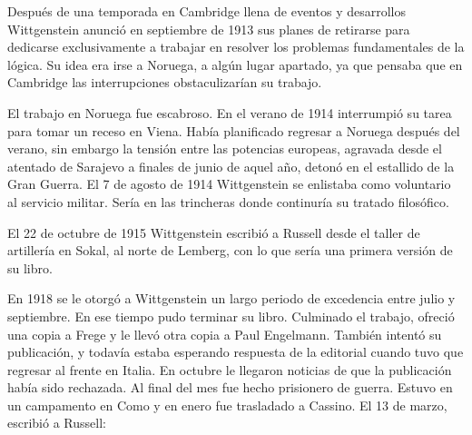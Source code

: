 Después de una temporada en Cambridge llena de eventos y desarrollos
Wittgenstein anunció en septiembre de 1913 sus planes de retirarse para
dedicarse exclusivamente a trabajar en resolver los problemas fundamentales de
la lógica. Su idea era irse a Noruega, a algún lugar apartado, ya que pensaba
que en Cambridge las interrupciones obstaculizarían su trabajo.\autocite[cap. 4
loc 1844]{monk1991duty}


El trabajo en Noruega fue escabroso. En el verano de 1914 interrumpió su tarea
para tomar un receso en Viena.\autocite[cap. 5 loc 2154]{monk1991duty} Había planificado
regresar a Noruega después del verano, sin embargo la tensión entre las
potencias europeas, agravada desde el atentado de Sarajevo a finales de junio de
aquel año, detonó en el estallido de la Gran Guerra. El 7 de agosto de 1914
Wittgenstein se enlistaba como voluntario al servicio militar. Sería en las
trincheras donde continuría su tratado filosófico.

El 22 de octubre de 1915 Wittgenstein escribió a Russell desde el taller de
artillería en Sokal, al norte de Lemberg, con lo que sería una primera versión
de su libro.\autocite[cf. p.84]{cambridgeletters} 

En 1918 se le otorgó a Wittgenstein un largo periodo de excedencia entre julio y
septiembre. En ese tiempo pudo terminar su libro. Culminado el trabajo, ofreció
una copia a Frege y le llevó otra copia a Paul Engelmann. También intentó su
publicación, y todavía estaba esperando respuesta de la editorial cuando tuvo
que regresar al frente en Italia. En octubre le llegaron noticias de que la
publicación había sido rechazada. Al final del mes fue hecho prisionero de
guerra. Estuvo en un campamento en Como y en enero fue trasladado a Cassino. El
13 de marzo, escribió a Russell\autocite[cf. p.268]{mcguinness}: 

